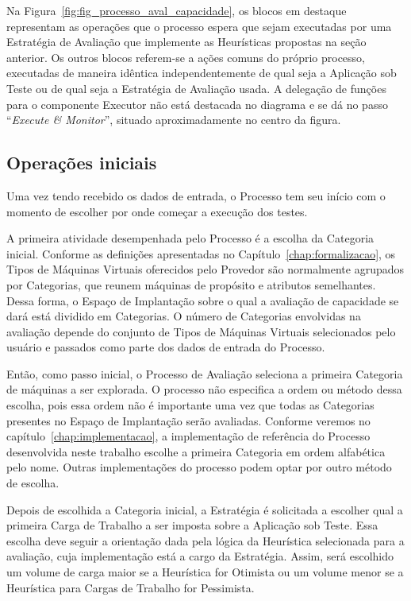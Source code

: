 Na Figura~\ref{fig:fig_processo_aval_capacidade}, os blocos em destaque representam
as operações que o processo espera que sejam executadas por uma Estratégia de 
Avaliação que implemente as Heurísticas propostas na seção anterior. Os outros 
blocos referem-se a ações comuns do próprio processo, executadas de maneira 
idêntica independentemente de qual seja a Aplicação sob Teste ou de qual seja a 
Estratégia de Avaliação usada. A delegação de funções para o componente Executor 
não está destacada no diagrama e se dá no passo ``\emph{Execute \& Monitor}'', 
situado aproximadamente no centro da figura.

\subsection{Operações iniciais}
\label{subsec:processo_operacoes_iniciais}
Uma vez tendo recebido os dados de entrada, o Processo tem seu início com o momento 
de escolher por onde começar a execução dos testes.

A primeira atividade desempenhada pelo Processo é a escolha da Categoria 
inicial. Conforme as definições apresentadas no Capítulo~\ref{chap:formalizacao}, 
os Tipos de Máquinas Virtuais oferecidos pelo Provedor são normalmente agrupados 
por Categorias, que reunem máquinas de propósito e atributos semelhantes. Dessa
forma, o Espaço de Implantação sobre o qual a avaliação de capacidade se dará está 
dividido em Categorias. O número de Categorias envolvidas na avaliação depende do 
conjunto de Tipos de Máquinas Virtuais selecionados pelo usuário e passados como
parte dos dados de entrada do Processo.

Então, como passo inicial, o Processo de Avaliação seleciona a primeira
Categoria de máquinas a ser explorada. O processo não especifica a ordem ou método 
dessa escolha, pois essa ordem não é importante uma vez que todas as Categorias 
presentes no Espaço de Implantação serão avaliadas. Conforme veremos no 
capítulo~\ref{chap:implementacao}, a implementação de referência do Processo 
desenvolvida neste trabalho escolhe a primeira Categoria em ordem alfabética pelo
nome. Outras implementações do processo podem optar por outro método de escolha. 

Depois de escolhida a Categoria inicial, a Estratégia é solicitada a escolher 
qual a primeira Carga de Trabalho a ser imposta sobre a Aplicação sob Teste. Essa 
escolha deve seguir a orientação dada pela lógica da Heurística selecionada para 
a avaliação, cuja implementação está a cargo da Estratégia. Assim, será escolhido
um volume de carga maior se a Heurística for Otimista ou um volume menor se a
Heurística para Cargas de Trabalho for Pessimista.

